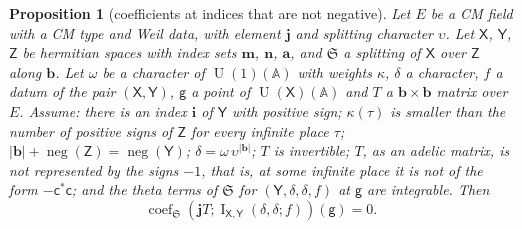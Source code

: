 \documentclass[11pt,a4paper]{article}
\theoremstyle{plainx}
\newtheorem{proposition}[theorem]{Proposition}
\theoremstyle{uprightx}
\newcommand{\ba}{\mathbf{a}}
\newcommand{\bb}{\mathbf{b}}
\newcommand{\bm}{\mathbf{m}}
\newcommand{\bn}{\mathbf{n}}
\newcommand{\sX}{\mathsf{X}}
\newcommand{\sY}{\mathsf{Y}}
\newcommand{\sZ}{\mathsf{Z}}
\newcommand{\sg}{\mathsf{g}}
\newcommand{\fS}{\mathfrak{S}}
\newcommand{\A}{\mathbb{A}}
\newcommand{\U}{\operatorname{U}}
\newcommand{\thI}[5]{\operatorname{I}_{#1,#2}(#3,#4;#5)}
\newcommand{\cf}[3]{\operatorname{coef}_{#1}(#2;#3)}
\newcommand{\negc}{\operatorname{neg}}
\begin{document}
\begin{proposition}[coefficients at indices that are not negative]\label{p:nonneg}
Let $E$ be a CM field with a CM type and Weil data, with element $\mathbf{j}$ and splitting character $\upsilon$. Let
$\sX$, $\sY$, $\sZ$ be hermitian spaces with index sets $\bm$, $\bn$, $\ba$, and $\fS$ a splitting of $\sX$ over
$\sZ$ along $\bb$. Let $\omega$ be a character of $\U(1)(\A)$ with weights $\kappa$, $\delta$ a character, $f$ a
datum of the pair $(\sX,\sY)$, $\sg$ a point of $\U(\sX)(\A)$ and $T$ a $\bb\times\bb$ matrix over $E$. Assume:
there is an index $\mathbf{i}$ of $\sY$ with positive sign; $\kappa(\tau)$ is smaller than the number of positive signs of
$\sZ$ for every infinite place $\tau$; $|\bb|+\negc(\sZ)=\negc(\sY)$; $\delta=\omega\,\upsilon^{|\bb|}$; $T$ is
invertible; $T$, as an adelic matrix, is not represented by the signs $-1$, that is, at some infinite place it is
not of the form $-\mathsf{c}^{*}\mathsf{c}$; and the theta terms of $\fS$ for $(\sY,\delta,\delta,f)$ at $\sg$ are integrable. Then
\[\cf{\fS}{\mathbf{j} T}{\thI{\sX}{\sY}{\delta}{\delta}{f}}(\sg)=0 .\]
\end{proposition}
\end{document}
